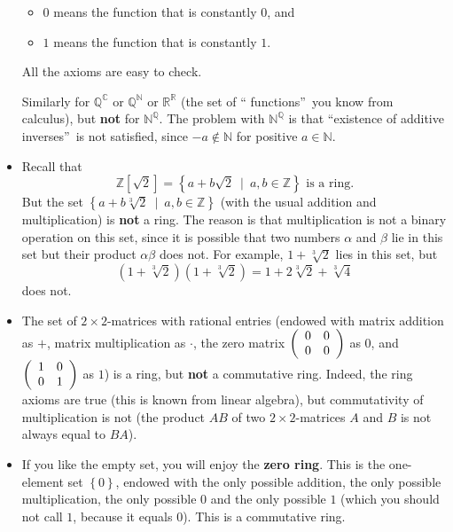 \documentclass[numbers=enddot,12pt,final,onecolumn,notitlepage]{scrartcl}%
\numberwithin{exer}{subsection}
\theoremstyle{definition}
\begin{document}
\begin{itemize}
\begin{itemize}
\item $0$ means the function that is constantly $0$, and

\item $1$ means the function that is constantly $1$.
\end{itemize}

All the axioms are easy to check.

Similarly for $\mathbb{Q}^{\mathbb{C}}$ or $\mathbb{Q}^{\mathbb{N}}$ or
$\mathbb{R}^{\mathbb{R}}$ (the set of \textquotedblleft
functions\textquotedblright\ you know from calculus), but \textbf{not} for
$\mathbb{N}^{\mathbb{Q}}$. The problem with $\mathbb{N}^{\mathbb{Q}}$ is that
\textquotedblleft existence of additive inverses\textquotedblright\ is not
satisfied, since $-a\notin\mathbb{N}$ for positive $a\in\mathbb{N}$.

\item Recall that%
\[
\mathbb{Z}\left[  \sqrt{2}\right]  =\left\{  a+b\sqrt{2}\ \mid\ a,b\in
\mathbb{Z}\right\}  \text{ is a ring.}%
\]
But the set $\left\{  a+b\sqrt[3]{2}\ \mid\ a,b\in\mathbb{Z}\right\}  $ (with
the usual addition and multiplication) is \textbf{not} a ring. The reason is
that multiplication is not a binary operation on this set, since it is
possible that two numbers $\alpha$ and $\beta$ lie in this set but their
product $\alpha\beta$ does not. For example, $1+\sqrt[3]{2}$ lies in this set,
but%
\[
\left(  1+\sqrt[3]{2}\right)  \left(  1+\sqrt[3]{2}\right)  =1+2\sqrt[3]%
{2}+\sqrt[3]{4}%
\]
does not.

\item The set of $2\times2$-matrices with rational entries (endowed with
matrix addition as $+$, matrix multiplication as $\cdot$, the zero matrix
$\left(
\begin{array}
[c]{cc}%
0 & 0\\
0 & 0
\end{array}
\right)  $ as $0$, and $\left(
\begin{array}
[c]{cc}%
1 & 0\\
0 & 1
\end{array}
\right)  $ as $1$) is a ring, but \textbf{not} a commutative ring. Indeed, the
ring axioms are true (this is known from linear algebra), but commutativity of
multiplication is not (the product $AB$ of two $2\times2$-matrices $A$ and $B$
is not always equal to $BA$).

\item If you like the empty set, you will enjoy the \textbf{zero ring}. This
is the one-element set $\left\{  0\right\}  $, endowed with the only possible
addition, the only possible multiplication, the only possible $0$ and the only
possible $1$ (which you should not call $1$, because it equals $0$). This is a
commutative ring. 
\end{itemize}
\end{document}
